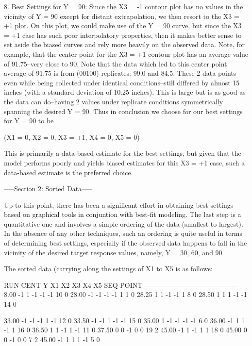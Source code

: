    8. Best Settings for Y = 90:
      Since the X3 = -1 contour plot has no values
      in the vicinity of Y = 90 except for distant
      extrapolation, we then resort to the X3 = +1
      plot.  On this plot, we could make use of
      the Y = 90 curve, but since the X3 = +1 case
      has such poor interpolatory properties, then
      it makes better sense to set aside the
      biased curves and rely more heavily on the
      observed data.  Note, for example, that the
      center point for the X3 = +1 contour plot
      has an average value of 91.75--very close to
      90.  Note that the data which led to this
      center point average of 91.75 is from
      (00100) replicates: 99.0 and 84.5.  These 2
      data points--even while being collected
      under identical conditions--still differed
      by almost 15 inches (with a standard
      deviation of 10.25 inches).  This is large
      but is as good as the data can do--having 2
      values under replicate conditions
      symmetrically spanning the desired Y = 90.
      Thus in conclusion we choose for our best
      settings for Y = 90 to be

            (X1 = 0, X2 = 0, X3 = +1, X4 = 0, X5 = 0)

      This is primarily a data-based estimate for
      the best settings, but given that the model
      performs poorly and yields biased estimates
      for this X3 = +1 case, such a data-based
      estimate is the preferred choice.

-----Section 2: Sorted Data-----

Up to this point, there has been a significant
effort in obtaining best settings based on
graphical tools in conjuntion with best-fit
modeling.  The last step is a quantitative one and
involves a simple ordering of the data (smallest
to largest).  In the absence of any other
techniques, such an ordering is quite useful in
terms of determining best settings, especially if
the observed data happens to fall in the vicinity
of the desired target response values, namely, Y =
30, 60, and 90.

The sorted data (carrying along the settings of X1
to X5 is as follows:


                                                 RUN  CENT
   Y      X1  X2  X3  X4  X5 SEQ POINT
----------------------------------------
  8.00    -1   1  -1  -1  -1  10     0
 28.00    -1  -1  -1  -1   1   1     0
 28.25     1   1  -1  -1   1   8     0
 28.50     1   1   1  -1  -1  14     0

 33.00    -1  -1  -1   1  -1  12     0
 33.50    -1  -1   1  -1  -1  15     0
 35.00     1  -1  -1  -1  -1   6     0
 36.00    -1   1   1  -1   1  16     0
 36.50     1   1  -1   1  -1  11     0
 37.50     0   0  -1   0   0  19     2
 45.00    -1   1  -1   1   1  18     0
 45.00     0   0  -1   0   0   7     2
 45.00    -1   1   1   1  -1   5     0

